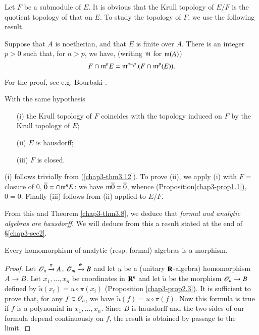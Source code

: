 Let $F$ be a submodule of $E$. It is obvious that the Krull topology of $E/F$ is the quotient topology of that on $E$. To study the topology of $F$, we use the following result.

\begin{theorem}\label{chap3-thm3.12}
Suppose that $A$ is noetherian, and that $E$ is finite over $A$. There is an integer $p>0$ such that, for $n>p$, we have, (writing $\mathfrak{m}$ for $\mathfrak{m}(A)$)
$$
F\cap \mathfrak{m}^{n}E=\mathfrak{m}^{n-p}.(F\cap \mathfrak{m}^{p}(E)).
$$
\end{theorem}

For the proof, see e.g. Bourbaki \cite{N. Bourbaki: 2}.
\begin{corollary}[Krull]\label{chap3-coro3.13}
With the same hypothesis
\begin{itemize}
\item[\rm(i)] the Krull topology of $F$ coincides with the topology induced on $F$ by the Krull topology of $E$;

\item[\rm(ii)] $E$ is hausdorff;

\item[\rm(iii)] $F$ is closed.
\end{itemize}
\end{corollary}
(i) follows trivially from (\ref{chap3-thm3.12}). To prove (ii), we apply (i) with $F=$ closure of $0$, $\overline{0}=\cap \mathfrak{m}^{n}E$: we have $\mathfrak{m}\overline{0}=\overline{0}$, whence (Proposition\pageoriginale \ref{chap3-prop1.1}), $\overline{0}=0$. Finally (iii) follows from (ii) applied to $E/F$.

From this and Theorem \ref{chap3-thm3.8}, we deduce that {\em formal and analytic algebras are hausdorff}. We will deduce from this a result stated at the end of \S\ref{chap3-sec2}.

\begin{proposition}\label{chap3-prop3.14}
Every homomorphism of analytic (resp. formal) algebras is a morphism.
\end{proposition}

\begin{proof}
Let $\mathscr{O}_{n}\xrightarrow{\pi}A$, $\mathscr{O}_{m}\xrightarrow{\psi}B$ and let $u$ be a (unitary $\mathbf{R}$-algebra) homomorphism $A\to B$. Let $x_{1},\ldots,x_{n}$ be coordinates in $\mathbf{R}^{n}$ and let $\widetilde{u}$ be the morphism $\mathscr{O}_{n}\to B$ defined by $\widetilde{u}(x_{i})=u\circ \pi(x_{i})$ (Proposition \ref{chap3-prop2.3}). It is sufficient to prove that, for any $f\in \mathscr{O}_{n}$, we have $\widetilde{u}(f)=u\circ \pi(f)$. Now this formula is true if $f$ is a polynomial in $x_{1},\ldots,x_{n}$. Since $B$ is hausdorff and the two sides of our formula depend continuously on $f$, the result is obtained by passage to the limit.
\end{proof}

